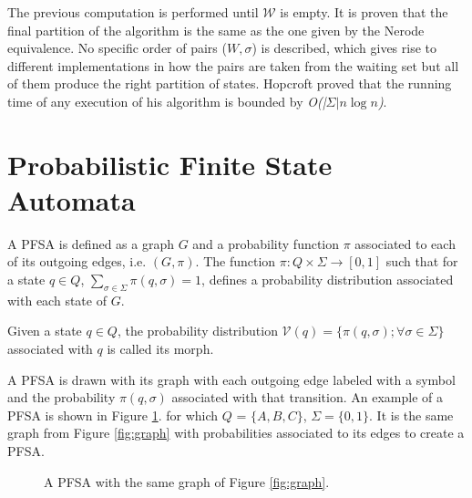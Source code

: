 {The previous computation is performed until $\mathcal{W}$ is empty. It is proven that the final partition of the algorithm is the same as the one given by the Nerode equivalence. No specific order of pairs ($W, \sigma$) is described, which gives rise to different implementations in how the pairs are taken from the waiting set but all of them produce the right partition of states. Hopcroft proved that the running time of any execution of his algorithm is bounded by \textit{O(|$\Sigma| n\log n$)}.

\section{Probabilistic Finite State Automata}

\begin{definition}\label{definition:pfsa}
A PFSA is defined as a graph $G$ and a probability function $\pi$ associated to each of its outgoing edges, i.e. $(G, \pi)$. The function $\pi: Q\times\Sigma \rightarrow [0,1]$ such that for a state $q \in Q$, $\sum\limits_{\sigma\in\Sigma}\pi(q,\sigma) = 1$, defines a probability distribution associated with each state of $G$.
\end{definition} 

\begin{definition}\label{definition:morph}
Given a state $q \in Q$, the probability distribution $\mathcal{V}(q) = \{ \pi(q, \sigma); \forall \sigma \in \Sigma\}$ associated with $q$ is called its morph.  
\end{definition}

A PFSA is drawn with its graph with each outgoing edge labeled with a symbol and the probability $\pi(q,\sigma)$ associated with that transition. An example of a PFSA is shown in Figure \ref{fig:pfsa}. for which $Q$ = $\{A, B, C\}$, $\Sigma = \{0, 1\}$. It is the same graph from Figure \ref{fig:graph} with probabilities associated to its edges to create a PFSA.

\begin{figure}
\centering
{}
\caption{A PFSA with the same graph of Figure \ref{fig:graph}.\label{fig:pfsa}}
\end{figure}

}

